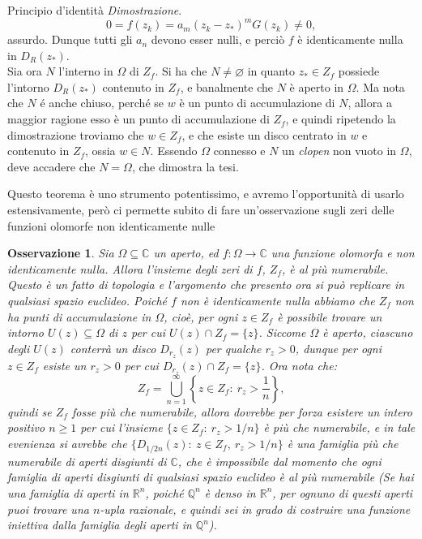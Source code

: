 \documentclass[11pt]{book}
\makeatletter
\theoremstyle{Definizione}
\theoremstyle{TeoremaProposizioneLemmaCorollarioCongettura}
\theoremstyle{OsservazioneNotaEsempio}
\newtheorem{myobs}{Osservazione}[section]
\renewenvironment{proof}[1][\proofname]{\par
  \normalfont \topsep6\p@\@plus6\p@\relax
  \trivlist
  \item[\hskip\labelsep
        \itshape
    #1\@addpunct{.}]\ignorespaces
}{%
  \endtrivlist\@endpefalse
}
\renewenvironment{proof}{\textsl{Dimostrazione}.}{}
\newcommand{\R}{\mathbb{R}}
\newcommand{\Q}{\mathbb{Q}}
\newcommand{\C}{\mathbb{C}}
\newcommand{\Disc}[3][]{D^{#1}_{{#2}}({#3})}
\makeatother
\begin{document}
\begin{boxteo}{Principio d'identità}
\begin{proof}
$$
0 = f(z_k) = a_m(z_k-z_*)^m G(z_k) \neq 0,
$$
assurdo. Dunque tutti gli $a_n$ devono esser nulli, e perciò $f$ è identicamente nulla in $\Disc{R}{z_*}$.\\
Sia ora $N$ l'interno in $\Omega$ di $Z_f$. Si ha che $N \neq \varnothing$ in quanto $z_*\in Z_f$ possiede l'intorno $\Disc{R}{z_*}$ contenuto in $Z_f$, e banalmente che $N$ è aperto in $\Omega$. Ma nota che $N$ é anche chiuso, perché se $w$ è un punto di accumulazione di $N$, allora a maggior ragione esso è un punto di accumulazione di $Z_f$, e quindi ripetendo la dimostrazione troviamo che $w\in Z_f$, e che esiste un disco centrato in $w$ e contenuto in $Z_f$, ossia $w\in N$. Essendo $\Omega$ connesso e $N$ un \textsl{clopen} non vuoto in $\Omega$, deve accadere che $N = \Omega$, che dimostra la tesi.
\end{proof}
\end{boxteo}
\noindent
Questo teorema è uno strumento potentissimo, e avremo l'opportunità di usarlo estensivamente, però ci permette subito di fare un'osservazione sugli zeri delle funzioni olomorfe non identicamente nulle
\begin{myobs}
Sia $\Omega \subseteq \C$ un aperto, ed $f:\Omega\longrightarrow \C$ una funzione olomorfa e non identicamente nulla. Allora l'insieme degli zeri di $f$, $Z_f$, è al più numerabile. Questo è un fatto di topologia e l'argomento che presento ora si può replicare in qualsiasi spazio euclideo.
Poiché $f$ non è identicamente nulla abbiamo che $Z_f$ non ha punti di accumulazione in $\Omega$, cioè, per ogni $z\in Z_f$ è possibile trovare un intorno $U(z)\subseteq \Omega$ di $z$ per cui $U(z)\cap Z_f = \{z\}$. Siccome $\Omega$ è aperto, ciascuno degli $U(z)$ conterrà un disco $\Disc{r_z}{z}$ per qualche $r_z > 0$, dunque per ogni $z\in Z_f$ esiste un $r_z > 0$ per cui $\Disc{r_z}{z} \cap Z_f = \{z\}$. Ora nota che:
$$
Z_f = \bigcup_{n = 1}^\infty \left\{z\in Z_f:\ r_z > \frac{1}{n}\right\},
$$
quindi se $Z_f$ fosse più che numerabile, allora dovrebbe per forza esistere un intero positivo $n \geq 1$ per cui l'insieme $\{z\in Z_f:\ r_z > 1/n\}$ è più che numerabile, e in tale evenienza si avrebbe che $\{\Disc{1/2n}{z}:\ z\in Z_f,\ r_z > 1/n\}$ è una famiglia più che numerabile di aperti disgiunti di $\C$, che è impossibile dal momento che ogni famiglia di aperti disgiunti di qualsiasi spazio euclideo è al più numerabile (Se hai una famiglia di aperti in $\R^n$, poiché $\Q^n$ è denso in $\R^n$, per ognuno di questi aperti puoi trovare una $n$-upla razionale, e quindi sei in grado di costruire una funzione iniettiva dalla famiglia degli aperti in $\Q^n$).
\end{myobs}
\end{document}
